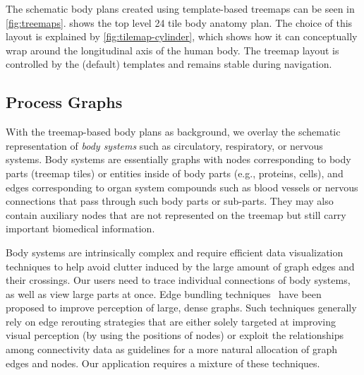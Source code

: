 
The schematic body plans created using template-based treemaps can be seen in \cref{fig:treemaps}.  shows the top level 24 tile body anatomy plan. The choice of this layout is explained by \cref{fig:tilemap-cylinder}, which shows how it can conceptually wrap around the longitudinal axis of the human body. The treemap layout is controlled by the (default) templates and remains stable during navigation.


\subsection{Process Graphs} %

With the treemap-based body plans as background, we overlay the schematic representation of \emph{body systems} such as circulatory, respiratory, or nervous systems. Body systems are essentially graphs with nodes corresponding to body parts (treemap tiles) or entities inside of body parts (e.g., proteins, cells), and edges corresponding to organ system compounds such as blood vessels or nervous connections that pass through such body parts or sub-parts.
They may also contain auxiliary nodes that are not represented on the treemap but still carry important biomedical information.

Body systems are intrinsically complex and require efficient data visualization techniques to help avoid clutter induced by the large amount of graph edges and their crossings. Our users need to trace individual connections of body systems, as well as view large parts at once. Edge bundling techniques~\cite{Hol06,GHN+11,HET12} have been proposed to improve perception of large, dense graphs. Such techniques generally rely on edge rerouting strategies that are either solely targeted at improving visual perception (by using the positions of nodes) or exploit the relationships among connectivity data as guidelines for a more natural allocation of graph edges and nodes. Our application requires a mixture of these techniques.

